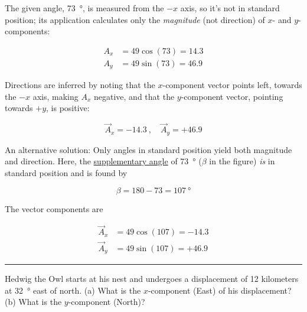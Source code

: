 \documentclass{article}
\begin{document}
The given angle, \SI{73}{\degree}, is measured from the $-x$ axis, so it's not in standard position; its application calculates only the \textit{magnitude} (not direction) of $x$- and $y$-components: 


\begin{align*}
    A_x &= 49 \cos{(73)} = 14.3\\[1ex]
    A_y &= 49 \sin{(73)} = 46.9
\end{align*}


Directions are inferred by noting that the $x$-component vector points left, towards the $-x$ axis, making $A_x$ negative, and that the $y$-component vector, pointing towards $+y$, is positive:

\begin{equation*}
    \vec{A}_x = -14.3\ , \hspace{1em}
    \vec{A}_y = +46.9
\end{equation*}

An alternative solution: Only angles in standard position yield both magnitude and direction. Here, the \href{https://mathworld.wolfram.com/SupplementaryAngles.html}{supplementary angle} of \SI{73}{\degree} ($\beta$ in the figure) \textit{is} in standard position and is found by

\begin{equation*}
    \beta = 180 - 73 = \SI{107}{\degree}
\end{equation*}

The vector components are

\begin{align*}
    \vec{A}_x &= 49 \cos{(107)} = -14.3\\[1ex]
    \vec{A}_y &= 49 \sin{(107)} = +46.9
\end{align*}

\hrule

\begin{example}
    Hedwig the Owl starts at his nest and undergoes a displacement of 12 kilometers at \SI{32}{\degree} east of north. (a) What is the $x$-component (East) of his displacement? (b) What is the $y$-component (North)?
\end{example}

\Solution
\end{document}
